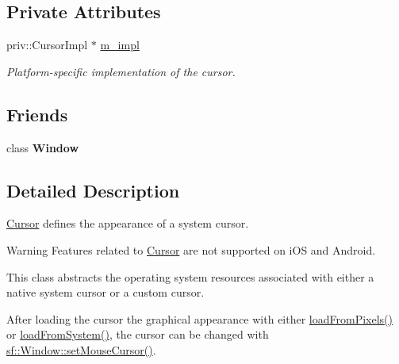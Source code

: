 \subsection*{Private Attributes}
\begin{DoxyCompactItemize}
\item 
\mbox{\label{classsf_1_1_cursor_a49fc938d6aceb515a3621b63e18327df}} 
priv\+::\+Cursor\+Impl $\ast$ \mbox{\hyperlink{classsf_1_1_cursor_a49fc938d6aceb515a3621b63e18327df}{m\+\_\+impl}}
\begin{DoxyCompactList}\small\item\em Platform-\/specific implementation of the cursor. \end{DoxyCompactList}\end{DoxyCompactItemize}
\subsection*{Friends}
\begin{DoxyCompactItemize}
\item 
\mbox{\label{classsf_1_1_cursor_a553f958a25683445088050a69d3de8e9}} 
class {\bfseries Window}
\end{DoxyCompactItemize}


\subsection{Detailed Description}
\mbox{\hyperlink{classsf_1_1_cursor}{Cursor}} defines the appearance of a system cursor. 

\begin{DoxyVerb}\end{DoxyVerb}


\begin{DoxyWarning}{Warning}
Features related to \mbox{\hyperlink{classsf_1_1_cursor}{Cursor}} are not supported on i\+OS and Android.
\end{DoxyWarning}
This class abstracts the operating system resources associated with either a native system cursor or a custom cursor.

After loading the cursor the graphical appearance with either \mbox{\hyperlink{classsf_1_1_cursor_ac24ecf82ac7d9ba6703389397f948b3a}{load\+From\+Pixels()}} or \mbox{\hyperlink{classsf_1_1_cursor_ad41999c8633c2fbaa2364e379c1ab25b}{load\+From\+System()}}, the cursor can be changed with \mbox{\hyperlink{classsf_1_1_window_aab7a05baece72b08ad120063b143d19b}{sf\+::\+Window\+::set\+Mouse\+Cursor()}}.

